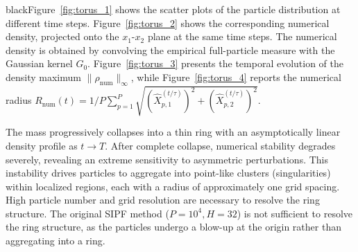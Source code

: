 \documentclass[review,onefignum,onetabnum]{siamart250211}
\begin{document}
\begin{color}{black}Figure~\ref{fig:torus_1} shows the scatter plots of the particle distribution at different time steps. Figure~\ref{fig:torus_2} shows the corresponding numerical density, projected onto the \(x_1\)-\(x_2\) plane at the same time steps. The numerical density is obtained by convolving the empirical full-particle measure with the Gaussian kernel \(G_0\). Figure~\ref{fig:torus_3} presents the temporal evolution of the density maximum \(\|\rho_{\mathrm{num}}\|_{\infty}\), while Figure~\ref{fig:torus_4} reports the numerical radius $R_{\text{num}}(t)=1/P\sum_{p=1}^P \sqrt{\left(\widehat{X}_{p,1}^{(t/\tau)}\right)^2+\left(\widehat{X}_{p,2}^{(t/\tau)}\right)^2}$.\end{color} The mass progressively collapses into a thin ring with an asymptotically linear density profile as \(t \to T\). After complete collapse, numerical stability degrades severely, revealing an extreme sensitivity to asymmetric perturbations. This instability drives particles to aggregate into point-like clusters (singularities) within localized regions, each with a radius of approximately one grid spacing. High particle number and grid resolution are necessary to resolve the ring structure. The original SIPF method ($P=10^4, H=32$) is not sufficient to resolve the ring structure, as the particles undergo a blow-up at the origin rather than aggregating into a ring.
\end{document}
